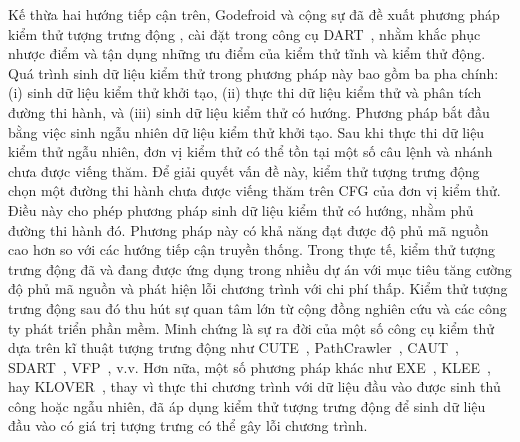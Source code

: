 Kế thừa hai hướng tiếp cận trên, Godefroid và cộng sự đã đề xuất phương pháp kiểm thử tượng trưng động \cite{ConcolicTesting}, cài đặt trong công cụ DART~\cite{DART}, nhằm khắc phục nhược điểm và tận dụng những ưu điểm của kiểm thử tĩnh và kiểm thử động. Quá trình sinh dữ liệu kiểm thử trong phương pháp này bao gồm ba pha chính: (i) sinh dữ liệu kiểm thử khởi tạo, (ii) thực thi dữ liệu kiểm thử và phân tích đường thi hành, và (iii) sinh dữ liệu kiểm thử có hướng. Phương pháp bắt đầu bằng việc sinh ngẫu nhiên dữ liệu kiểm thử khởi tạo. Sau khi thực thi dữ liệu kiểm thử ngẫu nhiên, đơn vị kiểm thử có thể tồn tại một số câu lệnh và nhánh chưa được viếng thăm. Để giải quyết vấn đề này, kiểm thử tượng trưng động chọn một đường thi hành chưa được viếng thăm trên CFG của đơn vị kiểm thử. Điều này cho phép phương pháp sinh dữ liệu kiểm thử có hướng, nhằm phủ đường thi hành đó. Phương pháp này có khả năng đạt được độ phủ mã nguồn cao hơn so với các hướng tiếp cận truyền thống. Trong thực tế, kiểm thử tượng trưng động đã và đang được ứng dụng trong nhiều dự án với mục tiêu tăng cường độ phủ mã nguồn và phát hiện lỗi chương trình với chi phí thấp. Kiểm thử tượng trưng động sau đó thu hút sự quan tâm lớn từ cộng đồng nghiên cứu và các công ty phát triển phần mềm. Minh chứng là sự ra đời của một số công cụ kiểm thử dựa trên kĩ thuật tượng trưng động như CUTE~\cite{CUTE}, PathCrawler~\cite{PathCrawler}, CAUT~\cite{CAUT}, SDART~\cite{SDART}, VFP~\cite{TUNG2022106821}, v.v. Hơn nữa, một số phương pháp khác như EXE~\cite{EXE}, KLEE~\cite{KLEE}, hay KLOVER~\cite{li2011klover}, thay vì thực thi chương trình với dữ liệu đầu vào được sinh thủ công hoặc ngẫu nhiên, đã áp dụng kiểm thử tượng trưng động để sinh dữ liệu đầu vào có giá trị tượng trưng có thể gây lỗi chương trình.

